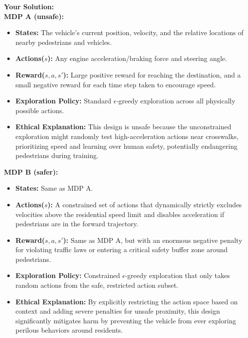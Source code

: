 \documentclass{article}
\theoremstyle{case}
\theoremstyle{definition}
\begin{document}
\begin{enumerate}
  \begin{shaded}
  \textbf{Your Solution:}\\
  \textbf{MDP A (unsafe):} 
  \begin{itemize}
      \item \textbf{States:} The vehicle's current position, velocity, and the relative locations of nearby pedestrians and vehicles.
      \item \textbf{Actions($s$):} Any engine acceleration/braking force and steering angle.
      \item \textbf{Reward($s,a,s'$):} Large positive reward for reaching the destination, and a small negative reward for each time step taken to encourage speed.
      \item \textbf{Exploration Policy:} Standard $\epsilon$-greedy exploration across all physically possible actions.
      \item \textbf{Ethical Explanation:} This design is unsafe because the unconstrained exploration might randomly test high-acceleration actions near crosswalks, prioritizing speed and learning over human safety, potentially endangering pedestrians during training.
  \end{itemize}
  \vspace{0.2cm}
  \textbf{MDP B (safer):}
  \begin{itemize}
      \item \textbf{States:} Same as MDP A.
      \item \textbf{Actions($s$):} A constrained set of actions that dynamically strictly excludes velocities above the residential speed limit 
      and disables acceleration if pedestrians are in the forward trajectory.
      \item \textbf{Reward($s,a,s'$):} Same as MDP A, but with an enormous negative penalty for violating traffic laws 
      or entering a critical safety buffer zone around pedestrians.
      \item \textbf{Exploration Policy:} Constrained $\epsilon$-greedy exploration that only takes random actions from the safe, restricted action subset.
      \item \textbf{Ethical Explanation:} By explicitly restricting the action space based on context and adding severe penalties for unsafe proximity, 
      this design significantly mitigates harm by preventing the vehicle from ever exploring perilous behaviors around residents.
  \end{itemize}
  \end{shaded}

\end{enumerate}
\end{document}
